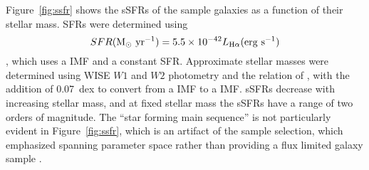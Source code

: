 \documentclass[preprint]{aastex61}
\begin{document}
%
%

Figure~\ref{fig:ssfr} shows the sSFRs of the sample galaxies as a function of their stellar mass. SFRs were determined using  
\begin{equation}
SFR({\rm M_\odot~ yr^{-1}}) =  5.5\times 10^{-42} L_{\rm H\alpha} ({\rm erg~s^{-1}})
\end{equation}
\citep{ken09}, which uses a \citet{kro01} IMF and a constant SFR. Approximate stellar masses were determined using WISE $W1$ and $W2$ photometry and the relation of \citet{clu14}, with the addition of 0.07~dex to convert from a \citet{cha03} IMF to a \citet{kro01} IMF. sSFRs decrease with increasing stellar mass, and at fixed stellar mass the sSFRs have a range of two orders of magnitude. The ``star forming main sequence'' \citep[e.g.,][]{noe07,elb11} is not particularly evident in Figure~\ref{fig:ssfr}, which is an artifact of the sample selection, which emphasized spanning parameter space rather than providing a flux limited galaxy sample \citep{mou06,mou10}.
\end{document}
